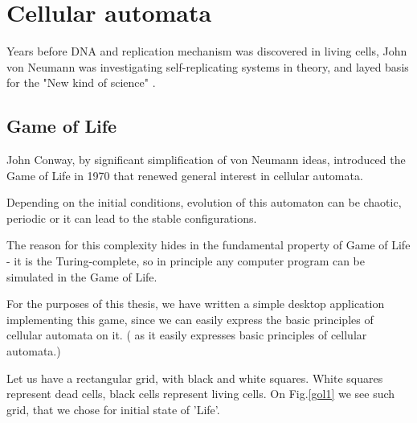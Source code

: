 \chapter{Cellular automata}


Years before DNA and replication mechanism was discovered in living cells,
John von Neumann was investigating self-replicating systems in theory, 
and layed basis for the "New kind of science" \cite{wolfram}. 



\section{Game of Life}

John Conway, by significant simplification of von Neumann ideas, introduced the Game of Life in 1970 that renewed general interest in cellular automata.

Depending on the initial conditions, evolution of this automaton can be chaotic, periodic or it can lead to the stable configurations.

The reason for this complexity hides in the fundamental property of Game of Life - it is the Turing-complete, so in principle any computer program can be simulated in the Game of Life.

For the purposes of this thesis, we have written a simple desktop application implementing this game, since we can easily express the basic principles of cellular automata on it. ( as it easily expresses basic principles of cellular automata.)

Let us have a rectangular grid, with black and white squares. 
White squares represent dead cells, black cells represent living cells.
On Fig.\ref{gol1} we see such grid, that we chose for initial state of 'Life'.


